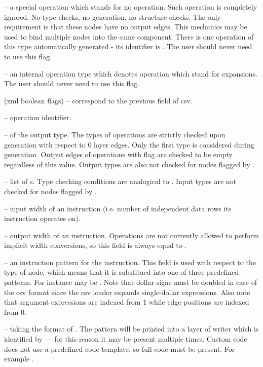 \begin{description}
\begin{description}
    \item {} -- a special operation which stands for no operation. Such operation is completely ignored. No type checks, no generation, no structure checks. The only requirement is that these nodes have no output edges. This mechanics may be used to bind multiple nodes into the same component. There is one operation of this type automatically generated - its identifier is . The user should never need to use this flag.
    \item {} -- an internal operation type which denotes operation which stand for expansions. The user should never need to use this flag.
  \end{description}
  \item {} (xml boolean flags) -- correspond to the previous field of csv.
  \item{} -- operation identifier.
  \item{} --  of the output type. The types of operations are strictly checked upon generation with respect to 0 layer edges. Only the first type is considered during generation. Output edges of operations with  flag are checked to be empty regardless of this value. Output types are also not checked for nodes flagged by .
  \item{} -- list of s. Type checking conditions are analogical to . Input types are not checked for nodes flagged by .
\item{} -- input width of an instruction (i.e. number of independent data rows its instruction operates on).
  \item{} -- output width of an instruction. Operations are not currently allowed to perform implicit width conversions, so this field is always equal to .
  \item{} -- an instruction pattern for the instruction. This field is used with respect to the type of node, which means that it is substitued into one of three predefined patterns. For instance  may be . Note that dollar signs must be doubled in case of the csv format since the csv loader expands single-dollar expressions. Also note that argument expressions are indexed from 1 while edge positions are indexed from 0.
  \item{} -- taking the format of  . The pattern will be printed into a layer of writer which is identified by  --- for this reason it may be present multiple times. Custom code does not use a predefined code template, so full code must be present. For example .
\end{description}

